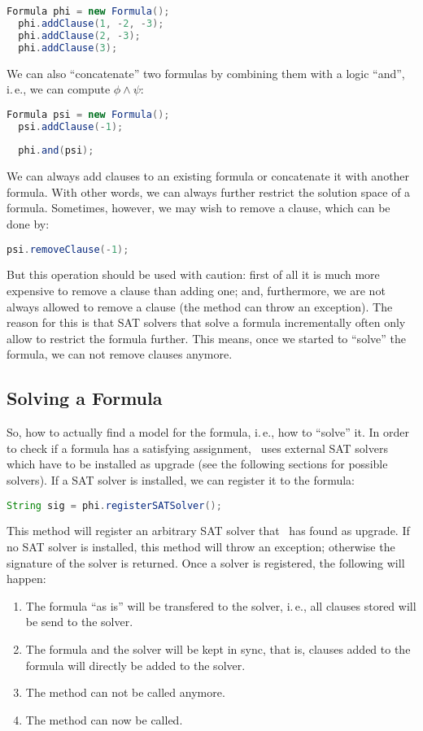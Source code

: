 \documentclass[a4paper, ukenglish, twoside, openright]{jdrasilmanual}
\begin{document}
\begin{lstlisting}[language=Java]
  Formula phi = new Formula();
  phi.addClause(1, -2, -3);
  phi.addClause(2, -3);
  phi.addClause(3);
\end{lstlisting}

We can also ``concatenate'' two formulas by combining them with a logic
``and'', i.\,e., we can compute $\phi\wedge\psi$:

\begin{lstlisting}[language=Java]
  Formula psi = new Formula();
  psi.addClause(-1);
  
  phi.and(psi);
\end{lstlisting}

We can always add clauses to an existing formula or concatenate it
with another formula. With other words, we can always further
restrict the solution space of a formula. Sometimes, however, we may
wish to remove a clause, which can be done by:
\begin{lstlisting}[language=Java]
  psi.removeClause(-1);
\end{lstlisting}
But this operation should be used with caution: first of all it is
much more expensive to remove a clause than adding one; and,
furthermore, we are not always allowed to remove a clause (the method
can throw an exception). The reason for this is that SAT solvers that
solve a formula incrementally often only allow to restrict the formula
further. This means, once we started to ``solve'' the formula, we
can not remove clauses anymore.

\subsection{Solving a Formula}
So, 
how to actually find a model for the formula, i.\,e., how to
``solve'' it. In order to check if a formula has a satisfying
assignment, \Jdrasil\ uses external SAT solvers which have to be
installed as upgrade (see the following sections for possible
solvers). If a SAT solver is installed, we can register it to the
formula:
\begin{lstlisting}[language=Java]
  String sig = phi.registerSATSolver();
\end{lstlisting}
This method will register an arbitrary SAT solver that \Jdrasil\ has
found as upgrade. If no SAT solver is installed, this method will
throw an exception; otherwise the signature of the solver is
returned. Once a solver is registered, the following will happen:
\begin{enumerate}
  \item The formula ``as is'' will be transfered to the solver,
    i.\,e., all clauses stored will be send to the solver.
  \item The formula and the solver will be kept in sync, that is,
    clauses added to the formula will directly be added to the solver.
  \item The method  can not be called
    anymore.
  \item The method  can now be called.
\end{enumerate}
\end{document}
